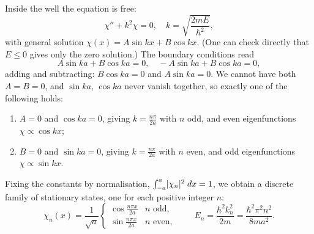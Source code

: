\documentclass[a4paper]{scrartcl}
\begin{document}
Inside the well the equation is free:
$$
\chi'' + k^2 \chi = 0, \quad k = \sqrt{\frac{2mE}{\hbar^2}},
$$
with general solution $\chi(x) = A \sin kx + B \cos kx$. (One can check directly that $E \leq 0$ gives only the zero solution.) The boundary conditions read
$$
A \sin ka + B \cos ka = 0, \quad -A \sin ka + B \cos ka = 0,
$$
adding and subtracting: $B \cos ka = 0$ and $A \sin ka = 0$. We cannot have both $A = B = 0$, and $\sin ka$, $\cos ka$ never vanish together, so exactly one of the following holds:
\begin{enumerate}[label=(\roman*)]
    \item $A = 0$ and $\cos ka = 0$, giving $k = \frac{n \pi}{2a}$ with $n$ odd, and even eigenfunctions $\chi \propto \cos kx$;
    \item $B = 0$ and $\sin ka = 0$, giving $k = \frac{n \pi}{2a}$ with $n$ even, and odd eigenfunctions $\chi \propto \sin kx$.
\end{enumerate}
Fixing the constants by normalisation, $\int_{-a}^{a} \lvert\chi_n\rvert^2 \; d x = 1$, we obtain a discrete family of stationary states, one for each positive integer $n$:
$$
\chi_n(x) = \frac{1}{\sqrt{a}} \begin{cases}
    \cos \frac{n \pi x}{2a} & n \text{ odd}, \\[2pt]
    \sin \frac{n \pi x}{2a} & n \text{ even},
\end{cases}
\qquad
E_n = \frac{\hbar^2 k_n^2}{2m} = \frac{\hbar^2 \pi^2 n^2}{8 m a^2}.
$$

\begin{center}
\end{center}
\end{document}
